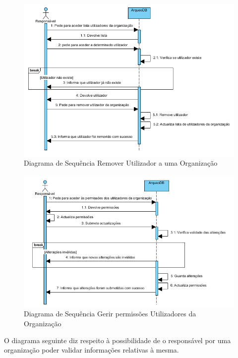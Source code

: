 \documentclass[12pt,a4paper]{article}
\begin{document}
\begin{figure}[h!]
\centering
\includegraphics[scale=1]{sequencia/removerutilizador}
\caption{Diagrama de Sequência Remover Utilizador a uma Organização} 
\end{figure}  

\begin{figure}[h!]
\centering
\includegraphics[scale=1]{sequencia/R_permissoes}
\caption{Diagrama de Sequência Gerir permissões Utilizadores da Organização} 
\end{figure}  

\clearpage
O diagrama seguinte diz respeito à possibilidade de o responsável por uma organização poder validar informações relativas à mesma.\\
\end{document}
